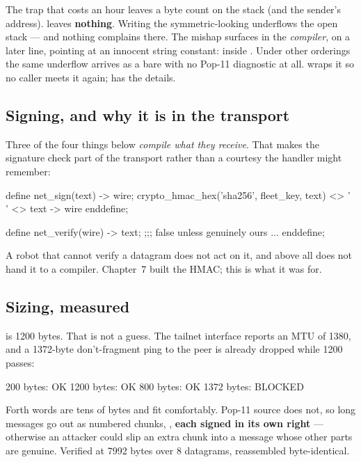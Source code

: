 \begin{callout}{The trap that costs an hour}
 leaves a byte count on the stack (and the sender's
address).  leaves \textbf{nothing}. Writing the
symmetric-looking  underflows the
open stack --- and nothing complains there. The mishap surfaces in the
\emph{compiler}, on a later line, pointing at an innocent string constant:
 inside .
Under other orderings the same underflow arrives as a bare
 with no Pop-11 diagnostic at all. 
wraps it so no caller meets it again;
 has the details.
\end{callout}

\subsection{Signing, and why it is in the transport}

Three of the four things below \emph{compile what they receive}. That makes
the signature check part of the transport rather than a courtesy the handler
might remember:

\begin{pop}
define net_sign(text) -> wire;
    crypto_hmac_hex('sha256', fleet_key, text) <> ' ' <> text -> wire
enddefine;

define net_verify(wire) -> text;                ;;; false unless genuinely ours
    ...
enddefine;
\end{pop}

A robot that cannot verify a datagram does not act on it, and above all does
not hand it to a compiler. Chapter~7 built the HMAC; this is what it was
for.

\subsection{Sizing, measured}

 is 1200 bytes. That is not a guess. The tailnet interface
reports an MTU of 1380, and a 1372-byte don't-fragment ping to the peer is
already dropped while 1200 passes:

\begin{repl}
  200 bytes: OK      1200 bytes: OK
  800 bytes: OK      1372 bytes: BLOCKED
\end{repl}

Forth words are tens of bytes and fit comfortably. Pop-11 source does not, so
long messages go out as numbered chunks, ,
\textbf{each signed in its own right} --- otherwise an attacker could slip an
extra chunk into a message whose other parts are genuine. Verified at 7992
bytes over 8 datagrams, reassembled byte-identical.

